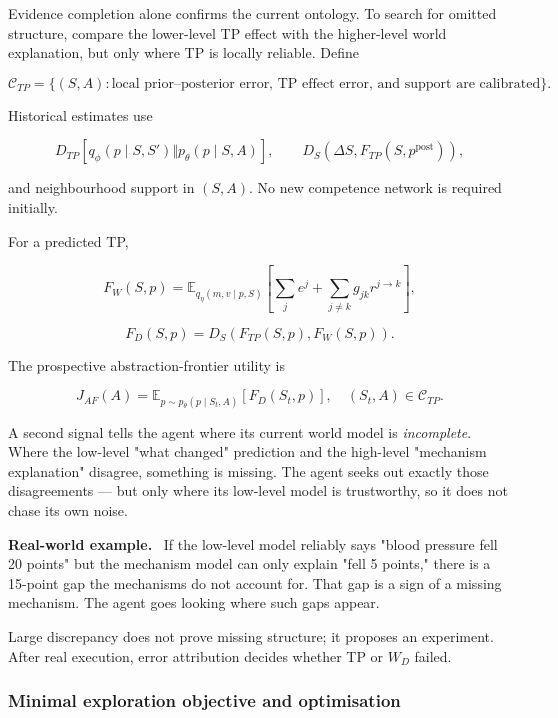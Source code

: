 \documentclass[11pt]{article}
\newenvironment{plainword}{%
  \par\medskip\noindent\begin{minipage}{\textwidth}%
  \color{gray!75!black}\small\itshape
}{%
  \end{minipage}\par\medskip}
\newenvironment{example}{%
  \par\smallskip\noindent\begin{minipage}{\textwidth}%
  \color{teal!60!black}\small
  \textbf{\color{teal!70!black}Real-world example.}\
}{%
  \end{minipage}\par\smallskip}
\begin{document}
Evidence completion alone confirms the current ontology. To search for omitted structure, compare the lower-level TP effect with the
higher-level world explanation, but only where TP is locally reliable. Define

\[
\boxed{
\mathcal C_{TP}=\{(S,A):
\text{local prior--posterior error, TP effect error, and support are calibrated}\}.}
\]

Historical estimates use

\[
D_{TP}[q_\phi(p\mid S,S')\Vert p_\theta(p\mid S,A)],
\qquad
D_S(\Delta S,F_{TP}(S,p^{\mathrm{post}})),
\]

and neighbourhood support in $(S,A)$. No new competence network is required initially.

For a predicted TP,

\[
F_W(S,p)=
\mathbb E_{q_\eta(m,v\mid p,S)}
\left[
\sum_je^j+\sum_{j\neq k}g_{jk}r^{j\rightarrow k}
\right],
\]

\[
\boxed{F_D(S,p)=D_S(F_{TP}(S,p),F_W(S,p)).}
\]

The prospective abstraction-frontier utility is

\[
\boxed{
J_{AF}(A)=
\mathbb E_{p\sim p_\theta(p\mid S_t,A)}[F_D(S_t,p)],
\quad (S_t,A)\in\mathcal C_{TP}.}
\]

\begin{plainword}
A second signal tells the agent where its current world model is \emph{incomplete}. Where the low-level "what changed" prediction and
the high-level "mechanism explanation" disagree, something is missing. The agent seeks out exactly those disagreements --- but only
where its low-level model is trustworthy, so it does not chase its own noise.
\end{plainword}

\begin{example}
If the low-level model reliably says "blood pressure fell 20 points" but the mechanism model can only explain "fell 5 points," there
is a 15-point gap the mechanisms do not account for. That gap is a sign of a missing mechanism. The agent goes looking where such
gaps appear.
\end{example}

Large discrepancy does not prove missing structure; it proposes an experiment. After real execution, error attribution decides
whether TP or $W_D$ failed.

\subsubsection*{Minimal exploration objective and optimisation}
\end{document}
